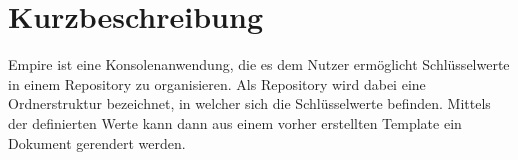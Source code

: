 
\section{Kurzbeschreibung}

Empire ist eine Konsolenanwendung, die es dem Nutzer ermöglicht Schlüsselwerte in einem Repository zu organisieren. Als Repository wird dabei eine Ordnerstruktur bezeichnet, in welcher sich die Schlüsselwerte befinden.
Mittels der definierten Werte kann dann aus einem vorher erstellten Template ein Dokument gerendert werden.